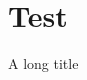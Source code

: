 \documentclass{article}
\begin{document}
\section{Test}

\begin{myincludedjava}{A long title}
    
\end{myincludedjava}
\end{document}
